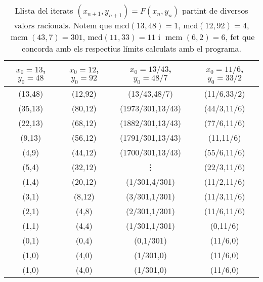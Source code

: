 \documentclass[11pt,a4paper]{article}
\theoremstyle{definition}
\renewcommand{\gcd}{\text{mcd}}
\DeclareMathOperator{\lcm}{mcm}
\begin{document}
\begin{table}[ht]
    \centering
    \begin{tabular}{|c|c|c|c|}
        \hline
        $x_0=13$, $y_0=48$ & $x_0=12$, $y_0=92$ & $x_0=13/43$, $y_0=48/7$ & $x_0=11/6$, $y_0=33/2$ \\
        \hline
        \hline
        (13,48)            & (12,92)            & (13/43,48/7)            & (11/6,33/2)            \\
        \hline
        (35,13)            & (80,12)            & (1973/301,13/43)        & (44/3,11/6)            \\
        \hline
        (22,13)            & (68,12)            & (1882/301,13/43)        & (77/6,11/6)            \\
        \hline
        (9,13)             & (56,12)            & (1791/301,13/43)        & (11,11/6)              \\
        \hline
        (4,9)              & (44,12)            & (1700/301,13/43)        & (55/6,11/6)            \\
        \hline
        (5,4)              & (32,12)            & \vdots                  & (22/3,11/6)            \\
        \hline
        (1,4)              & (20,12)            & (1/301,4/301)           & (11/2,11/6)            \\
        \hline
        (3,1)              & (8,12)             & (3/301,1/301)           & (11/3,11/6)            \\
        \hline
        (2,1)              & (4,8)              & (2/301,1/301)           & (11/6,11/6)            \\
        \hline
        (1,1)              & (4,4)              & (1/301,1/301)           & (0,11/6)               \\
        \hline
        (0,1)              & (0,4)              & (0,1/301)               & (11/6,0)               \\
        \hline
        (1,0)              & (4,0)              & (1/301,0)               & (11/6,0)               \\
        \hline
        (1,0)              & (4,0)              & (1/301,0)               & (11/6,0)               \\
        \hline
    \end{tabular}
    \caption{Llista del iterats $(x_{n+1},y_{n+1})=F(x_n,y_n)$ partint de diversos valors racionals. Notem que $\gcd(13,48)=1$, $\gcd(12,92)=4$, $\lcm(43,7)=301$, $\gcd(11,33)=11$ i $\lcm(6,2)=6$, fet que concorda amb els respectius límits calculats amb el programa.}
    \label{tab:rational}
\end{table}
\end{document}
